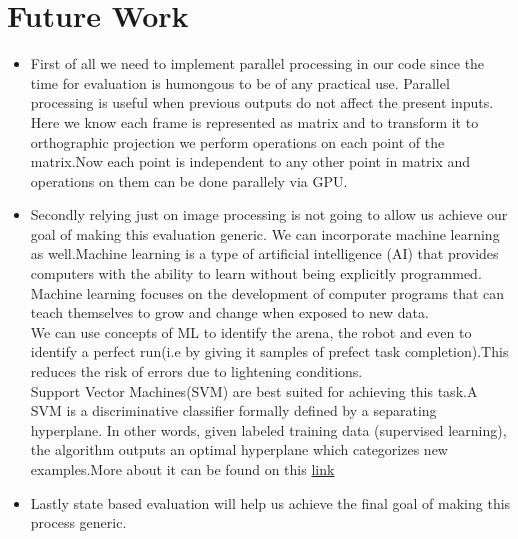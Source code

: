 \documentclass[a4paper,12pt,oneside]{book}
\begin{document}
\section{Future Work}
\begin{itemize}
\item First of all we need to implement parallel processing in our code since the time for evaluation is humongous to be of any practical use.
Parallel processing is useful when previous outputs do not affect the present inputs.\\
Here we know each frame is represented as matrix and to transform it to orthographic projection we perform operations on each point of the matrix.Now each point is independent to any other point in matrix and operations on them can be done parallely via GPU.
\item Secondly relying just on image processing is not going to allow us achieve our goal of making this evaluation generic. We can incorporate machine learning as well.Machine learning is a type of artificial intelligence (AI) that provides computers with the ability to learn without being explicitly programmed. Machine learning focuses on the development of computer programs that can teach themselves to grow and change when exposed to new data.\\
We can use concepts of ML to identify the arena, the robot and even to identify a perfect run(i.e by giving it samples of prefect task completion).This reduces the risk of errors due to lightening conditions.\\
Support Vector Machines(SVM) are best suited for achieving this task.A SVM is a discriminative classifier formally defined by a separating hyperplane. In other words, given labeled training data (supervised learning), the algorithm outputs an optimal hyperplane which categorizes new examples.More about it can be found on this \href{http://docs.opencv.org/2.4/doc/tutorials/ml/introduction_to_svm/introduction_to_svm.html}{link}
\item Lastly state based evaluation will help us achieve the final goal of making this process generic.
\end{itemize}
\end{document}
